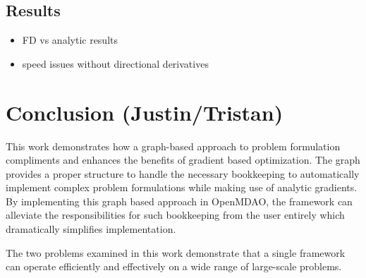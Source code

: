 \documentclass[]{aiaa-tc} %
\begin{document}
    \subsection{Results}
        \begin{itemize}
            \item FD vs analytic results
            \item speed issues without directional derivatives
        \end{itemize}


  \section{Conclusion (Justin/Tristan)}

      This work demonstrates how a graph-based approach to problem formulation compliments and enhances the benefits of gradient based
      optimization. The graph provides a proper structure to handle the necessary bookkeeping to automatically implement complex
      problem formulations while making use of analytic gradients. By implementing this graph based approach in OpenMDAO, the framework
      can alleviate the responsibilities for such bookkeeping from the user entirely which dramatically simplifies implementation.

      The two problems examined in this work demonstrate that a single framework can operate efficiently and effectively on a wide range of large-scale problems.

  
\end{document}
